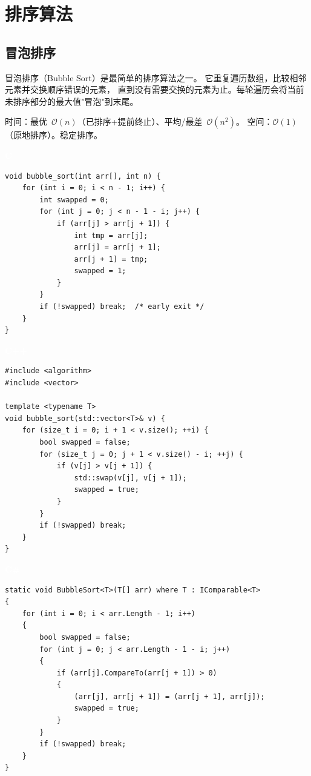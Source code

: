 \documentclass[12pt,a4paper,fontset=fandol]{ctexbook}
\newcommand{\clabel}{%
  \noindent\begin{tcolorbox}[sharp corners,colback=cheadbg,colframe=cheadbg,
    left=6pt,right=6pt,top=2pt,bottom=2pt,boxrule=0pt]
  \textcolor{white}{\small\bfseries\sffamily C}\end{tcolorbox}%
}
\newcommand{\cpplabel}{%
  \noindent\begin{tcolorbox}[sharp corners,colback=cppheadbg,colframe=cppheadbg,
    left=6pt,right=6pt,top=2pt,bottom=2pt,boxrule=0pt]
  \textcolor{white}{\small\bfseries\sffamily C++}\end{tcolorbox}%
}
\newcommand{\csharplabel}{%
  \noindent\begin{tcolorbox}[sharp corners,colback=csharpheadbg,colframe=csharpheadbg,
    left=6pt,right=6pt,top=2pt,bottom=2pt,boxrule=0pt]
  \textcolor{white}{\small\bfseries\sffamily C\#}\end{tcolorbox}%
}
\newcommand{\bigO}[1]{\mathcal{O}(#1)}
\begin{document}
\mainmatter

\part{排序算法}

\chapter{冒泡排序}

冒泡排序（Bubble Sort）是最简单的排序算法之一。
它重复遍历数组，比较相邻元素并交换顺序错误的元素，
直到没有需要交换的元素为止。每轮遍历会将当前未排序部分的最大值"冒泡"到末尾。

\begin{complexitybox}
  时间：最优~$\bigO{n}$（已排序+提前终止）、平均/最差~$\bigO{n^2}$。
  空间：$\bigO{1}$（原地排序）。稳定排序。
\end{complexitybox}

\clabel
\begin{lstlisting}[style=cstyle]
void bubble_sort(int arr[], int n) {
    for (int i = 0; i < n - 1; i++) {
        int swapped = 0;
        for (int j = 0; j < n - 1 - i; j++) {
            if (arr[j] > arr[j + 1]) {
                int tmp = arr[j];
                arr[j] = arr[j + 1];
                arr[j + 1] = tmp;
                swapped = 1;
            }
        }
        if (!swapped) break;  /* early exit */
    }
}
\end{lstlisting}

\cpplabel
\begin{lstlisting}[style=cppstyle]
#include <algorithm>
#include <vector>

template <typename T>
void bubble_sort(std::vector<T>& v) {
    for (size_t i = 0; i + 1 < v.size(); ++i) {
        bool swapped = false;
        for (size_t j = 0; j + 1 < v.size() - i; ++j) {
            if (v[j] > v[j + 1]) {
                std::swap(v[j], v[j + 1]);
                swapped = true;
            }
        }
        if (!swapped) break;
    }
}
\end{lstlisting}

\csharplabel
\begin{lstlisting}[style=csharpstyle]
static void BubbleSort<T>(T[] arr) where T : IComparable<T>
{
    for (int i = 0; i < arr.Length - 1; i++)
    {
        bool swapped = false;
        for (int j = 0; j < arr.Length - 1 - i; j++)
        {
            if (arr[j].CompareTo(arr[j + 1]) > 0)
            {
                (arr[j], arr[j + 1]) = (arr[j + 1], arr[j]);
                swapped = true;
            }
        }
        if (!swapped) break;
    }
}
\end{lstlisting}
\end{document}
